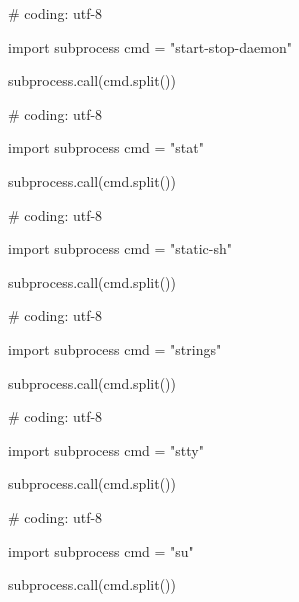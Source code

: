 \begin{mylisting}[label={lst:acpid},language=sh,caption=start-stop-daemon]

# coding: utf-8

import subprocess
cmd = "start-stop-daemon"

subprocess.call(cmd.split())

\end{mylisting}

\begin{mylisting}[label={lst:acpid},language=sh,caption=stat]

# coding: utf-8

import subprocess
cmd = "stat"

subprocess.call(cmd.split())

\end{mylisting}

\begin{mylisting}[label={lst:acpid},language=sh,caption=static-sh]

# coding: utf-8

import subprocess
cmd = "static-sh"

subprocess.call(cmd.split())

\end{mylisting}

\begin{mylisting}[label={lst:acpid},language=sh,caption=strings]

# coding: utf-8

import subprocess
cmd = "strings"

subprocess.call(cmd.split())

\end{mylisting}

\begin{mylisting}[label={lst:acpid},language=sh,caption=stty]

# coding: utf-8

import subprocess
cmd = "stty"

subprocess.call(cmd.split())

\end{mylisting}

\begin{mylisting}[label={lst:acpid},language=sh,caption=su]

# coding: utf-8

import subprocess
cmd = "su"

subprocess.call(cmd.split())

\end{mylisting}

